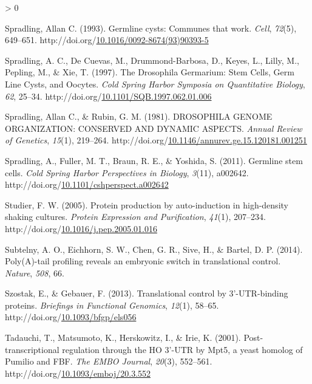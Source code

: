 \documentclass[12pt,oneside]{reedthesis}
\newlength{\cslhangindent}
\newenvironment{CSLReferences}[2] %
 {%
  \setlength{\parindent}{0pt}
  \ifodd #1 \everypar{\setlength{\hangindent}{\cslhangindent}}\ignorespaces\fi
  \ifnum #2 > 0
  \setlength{\parskip}{#2\baselineskip}
  \fi
 }%
 {}
\begin{document}
\begin{CSLReferences}{1}{0}
\leavevmode\hypertarget{ref-Spradling1993b}{}%
Spradling, Allan C. (1993). Germline cysts: {Communes} that work. \emph{Cell}, \emph{72}(5), 649--651. http://doi.org/\href{https://doi.org/10.1016/0092-8674(93)90393-5}{10.1016/0092-8674(93)90393-5}

\leavevmode\hypertarget{ref-Spradling1997e}{}%
Spradling, A. C., De Cuevas, M., Drummond-Barbosa, D., Keyes, L., Lilly, M., Pepling, M., \& Xie, T. (1997). The {Drosophila Germarium}: {Stem Cells}, {Germ Line Cysts}, and {Oocytes}. \emph{Cold Spring Harbor Symposia on Quantitative Biology}, \emph{62}, 25--34. http://doi.org/\href{https://doi.org/10.1101/SQB.1997.062.01.006}{10.1101/SQB.1997.062.01.006}

\leavevmode\hypertarget{ref-Spradling1981b}{}%
Spradling, Allan C., \& Rubin, G. M. (1981). {DROSOPHILA GENOME ORGANIZATION}: {CONSERVED AND DYNAMIC ASPECTS}. \emph{Annual Review of Genetics}, \emph{15}(1), 219--264. http://doi.org/\href{https://doi.org/10.1146/annurev.ge.15.120181.001251}{10.1146/annurev.ge.15.120181.001251}

\leavevmode\hypertarget{ref-Spradling2011f}{}%
Spradling, A., Fuller, M. T., Braun, R. E., \& Yoshida, S. (2011). Germline stem cells. \emph{Cold Spring Harbor Perspectives in Biology}, \emph{3}(11), a002642. http://doi.org/\href{https://doi.org/10.1101/cshperspect.a002642}{10.1101/cshperspect.a002642}

\leavevmode\hypertarget{ref-studierProteinProductionAutoinduction2005}{}%
Studier, F. W. (2005). Protein production by auto-induction in high-density shaking cultures. \emph{Protein Expression and Purification}, \emph{41}(1), 207--234. http://doi.org/\href{https://doi.org/10.1016/j.pep.2005.01.016}{10.1016/j.pep.2005.01.016}

\leavevmode\hypertarget{ref-Subtelny2014a}{}%
Subtelny, A. O., Eichhorn, S. W., Chen, G. R., Sive, H., \& Bartel, D. P. (2014). Poly({A})-tail profiling reveals an embryonic switch in translational control. \emph{Nature}, \emph{508}, 66.

\leavevmode\hypertarget{ref-Szostak2013l}{}%
Szostak, E., \& Gebauer, F. (2013). Translational control by 3'-{UTR}-binding proteins. \emph{Briefings in Functional Genomics}, \emph{12}(1), 58--65. http://doi.org/\href{https://doi.org/10.1093/bfgp/els056}{10.1093/bfgp/els056}

\leavevmode\hypertarget{ref-Tadauchi2001a}{}%
Tadauchi, T., Matsumoto, K., Herskowitz, I., \& Irie, K. (2001). Post-transcriptional regulation through the {HO} 3'-{UTR} by {Mpt5}, a yeast homolog of {Pumilio} and {FBF}. \emph{The EMBO Journal}, \emph{20}(3), 552--561. http://doi.org/\href{https://doi.org/10.1093/emboj/20.3.552}{10.1093/emboj/20.3.552}


\end{CSLReferences}
\end{document}
